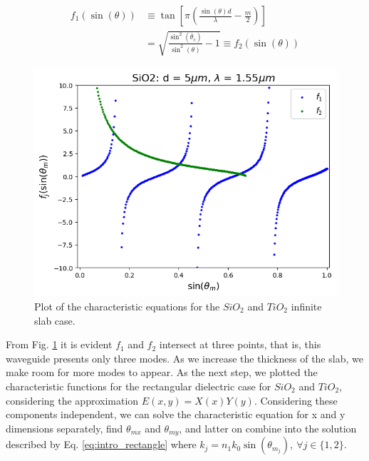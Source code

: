 \documentclass[conference, a4paper]{IEEEtran}
\begin{document}
\begin{equation}
    \begin{split}
        f_1(\sin(\theta)) 
        &\equiv \tan\left[ \pi \left(\frac{\sin(\theta) d}{\lambda} - \frac{m}{2}\right) \right] \\
        &= \sqrt{\frac{\sin^2(\overline{\theta}_c)}{\sin^2(\theta)} - 1} \equiv f_2(\sin(\theta))
    \end{split}
    \label{eq:intro_equation}
\end{equation}

\begin{figure}[H]
    \centering
    \centering
    \includegraphics[scale=0.4]{modes_SiO2_d5um_wv1.55um.png}
    \caption{$SiO_2$.}
    \caption{Plot of the characteristic equations for the $SiO_2$ and $TiO_2$ infinite slab case.}
    \label{fig:intro_equation}
\end{figure}

From Fig. \ref{fig:intro_equation} it is evident $f_1$ and $f_2$ intersect at three points, that is, this waveguide presents only three modes. As we increase the thickness of the slab, we make room for more modes to appear. As the next step, we plotted the characteristic functions for the rectangular dielectric case for $SiO_2$ and $TiO_2$, considering the approximation $E(x, y) = X(x) Y(y)$. Considering these components independent, we can solve the characteristic equation for x and y dimensions separately, find $\theta_{mx}$ and $\theta_{my}$, and latter on combine into the solution described by Eq. \eqref{eq:intro_rectangle} where $k_{j} = n_1 k_0 \sin(\theta_{m_j}), \ \forall j \in\{1, 2\}$.
\end{document}
